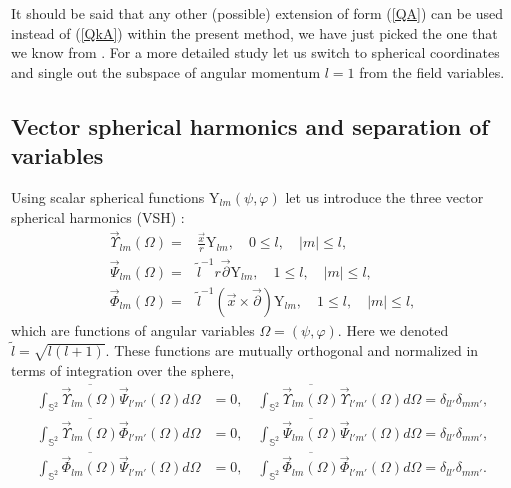 \documentclass[12pt]{article}
\newcommand{\pl}{\partial}
\newcommand{\Sph}{\mathbb{S}}
\newcommand{\YY}{\mathrm{Y}}
\begin{document}
    It should be said that any other (possible) extension of form
(\ref{QA})
    can be used instead of
    (\ref{QkA})
    within the present method,
    we have just picked the one that we know from
\cite{Inv}.
    For a more detailed study let us switch to spherical coordinates
    and single out the subspace of angular momentum
$ l=1 $
    from the field variables.



\subsection{Vector spherical harmonics and separation
	    of variables}
	Using  scalar spherical functions
$ \YY_{lm}(\psi,\varphi) $
	let us introduce the three vector spherical harmonics (VSH)
\cite{VSH}:
\begin{align}
\label{VSH1}
    \vec{\Upsilon}_{lm}(\Omega) = & \frac{\vec{x}}{r} \YY_{lm} , \quad
        0 \leq l, \quad |m| \leq l, \\
    \vec{\Psi}_{lm}(\Omega) = & \tilde{l}^{-1} r \vec{\pl} \YY_{lm} , \quad
        1 \leq l , \quad |m| \leq l, \\
\label{VSH3}
    \vec{\Phi}_{lm}(\Omega)
	= & \tilde{l}^{-1} (\vec{x} \times \vec{\pl}) \YY_{lm},
        \quad 1 \leq l , \quad |m| \leq l ,
\end{align}
	which are functions of angular variables
$ \Omega = (\psi,\varphi) $.
	Here we denoted
$ \tilde{l} = \sqrt{l(l+1)} $.
	These functions are mutually orthogonal and normalized
    in terms of integration over the sphere,
\begin{align*}
    \int_{\Sph^{2}} \overline{\vec{\Upsilon}_{lm}(\Omega)}
        \vec{\Psi}_{l'm'}(\Omega) d\Omega & = 0 ,\quad
    \int_{\Sph^{2}} \overline{\vec{\Upsilon}_{lm}(\Omega)}
        \vec{\Upsilon}_{l'm'}(\Omega) d\Omega = \delta_{ll'} \delta_{mm'} , \\
    \int_{\Sph^{2}} \overline{\vec{\Upsilon}_{lm}(\Omega)}
        \vec{\Phi}_{l'm'}(\Omega) d\Omega       & = 0 ,\quad
    \int_{\Sph^{2}} \overline{\vec{\Psi}_{lm}(\Omega)}
        \vec{\Psi}_{l'm'}(\Omega) d\Omega = \delta_{ll'} \delta_{mm'} , \\
    \int_{\Sph^{2}} \overline{\vec{\Phi}_{lm}(\Omega)}
        \vec{\Psi}_{l'm'}(\Omega) d\Omega & = 0 ,\quad
    \int_{\Sph^{2}} \overline{\vec{\Phi}_{lm}(\Omega)}
        \vec{\Phi}_{l'm'}(\Omega) d\Omega = \delta_{ll'} \delta_{mm'} .
\end{align*}
\end{document}
